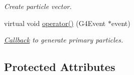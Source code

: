\begin{DoxyCompactItemize}
\begin{DoxyCompactList}\small\item\em Create particle vector. \end{DoxyCompactList}\item 
virtual void \hyperlink{class_d_d4hep_1_1_simulation_1_1_geant4_input_action_abda8423a68e04eec20eb52c01883c0ba}{operator()} (G4\+Event $\ast$event)
\begin{DoxyCompactList}\small\item\em \hyperlink{class_d_d4hep_1_1_callback}{Callback} to generate primary particles. \end{DoxyCompactList}\end{DoxyCompactItemize}
\subsection*{Protected Attributes}
